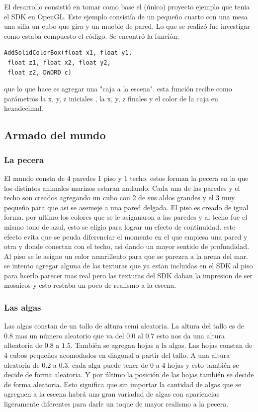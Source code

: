 \documentclass[10pt, a4paper, twocolumn]{article}
\begin{document}
El desarrollo consistió en tomar como base el (único) proyecto ejemplo que tenia el SDK en OpenGL. Este ejemplo consistía de un pequeño cuarto con una mesa una silla un cubo que gira y un mueble de pared. Lo que se realizó fue investigar como estaba compuesto el código. Se encontró la función:
\begin{lstlisting}
AddSolidColorBox(float x1, float y1,
 float z1, float x2, float y2, 
 float z2, DWORD c)
\end{lstlisting}
que lo que hace es agregar una "caja a la escena". esta función recibe como parámetros la x, y, z iniciales , la x, y, z finales y el color de la caja en hexadecimal.

\subsection{Armado del mundo}
\subsubsection{La pecera}
El mundo consta de 4 paredes 1 piso y 1 techo. estos forman la pecera en la que los distintos animales marinos estaran nadando.
Cada una de las paredes y el techo son creados agregando un cubo con 2 de sus aldos grandes y el 3 muy pequeño para que asi se asemeje a una pared delgada. El piso es creado de igual forma. por ultimo los colores que se le asiganaron a las paredes y al techo fue el mismo tono de azul, esto se eligio para lograr un efecto de continuidad. este efecto evita que se peuda diferenciar el momento en el que empiesa una pared y otra y donde conectan con el techo, asi dando un mayor sentido de profundidad.
Al piso se le asigno un color amarillento para que se parezca a la arena del mar. 
se intento agregar alguna de las texturas que ya estan incluidas en el SDK al piso para hcerlo parecer mas real pero las texturas del SDK daban la impresion de ser mosaicos y esto restaba un poco de realismo a la escena.  

\subsubsection{Las algas}
Las algas constan de un tallo de altura semi aleatoria. La altura del tallo es de 0.8 mas un número aleatorio que va del $0.0$ al $0.7$ esto nos da una altura alteatoria de $0.8$ a $1.5$. También se agregan hojas a la algas. Las hojas constan de 4 cubos pequeños acomodados en diagonal a partir del tallo. A una altura aleatoria de $0.2$ a $0.3$. cada alga puede tener de 0 a 4 hojas y esto también se decide de forma aleatoria. Y por último la posición de las hojas también se decide de forma aleatoria. Esto significa que sin importar la cantidad de algas que se agreguen a la escena habrá una gran variadad de algas con apariencias ligeramente diferentes para darle un toque de mayor realismo a la pecera.
\end{document}
